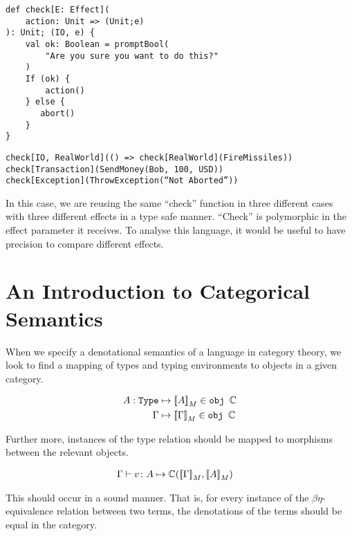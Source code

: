 \documentclass{Report}
\begin{document}
\begin{framed}
    \begin{framed}
        \begin{verbatim}
def check[E: Effect](
    action: Unit => (Unit;e)
): Unit; (IO, e) {
    val ok: Boolean = promptBool(
        "Are you sure you want to do this?"
    )
    If (ok) {
        action()
    } else {
       abort()
    }
}  
            \end{verbatim}
    \end{framed}

    \begin{framed}
        \begin{verbatim}
check[IO, RealWorld](() => check[RealWorld](FireMissiles))
check[Transaction](SendMoney(Bob, 100, USD))
check[Exception](ThrowException(“Not Aborted”))
        \end{verbatim}
    \end{framed}
\end{framed}

In this case, we are reusing the same “check” function in three different cases with three different effects in a type safe manner. “Check” is polymorphic in the effect parameter it receives. To analyse this language, it would be useful to have precision to compare different effects.

\section{An Introduction to Categorical Semantics}
When we specify a denotational semantics of a language in category theory, we look to find a mapping of types and typing environments to objects in a given category.

\begin{align}
    A: \texttt{Type} & \mapsto {\bf [\![}A{\bf ]\!]}_M \in \texttt{obj } \mathbb{C} \\
    \Gamma & \mapsto  {\bf [\![}\Gamma{\bf ]\!]}_M \in \texttt{obj } \mathbb{C}
\end{align}



Further more, instances of the type relation should be mapped to morphisms between the relevant objects.

\begin{align}
    \Gamma \vdash v \colon A & \mapsto \mathbb{C}({\bf [\![}\Gamma{\bf ]\!]}_M, {\bf [\![}A{\bf ]\!]}_M) 
\end{align}

This should occur in a sound manner. That is, for every instance of the $\beta\eta$-equivalence relation between two terms, the denotations of the terms should be equal in the category.
\end{document}
